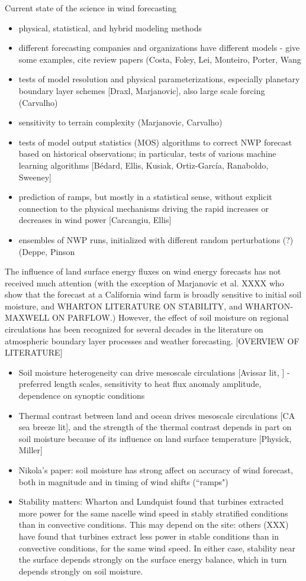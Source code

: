 \documentclass[12pt]{amsart}
\begin{document}
Current state of the science in wind forecasting
\begin{itemize}
\item physical, statistical, and hybrid modeling methods
\item different forecasting companies and organizations have different models - give some examples, cite review papers (Costa, Foley, Lei, Monteiro, Porter, Wang
\item tests of model resolution and physical parameterizations, especially planetary boundary layer schemes [Draxl, Marjanovic], also large scale forcing (Carvalho)
\item sensitivity to terrain complexity (Marjanovic, Carvalho)
\item tests of model output statistics (MOS) algorithms to correct NWP forecast based on historical observations; in particular, tests of various machine learning algorithms [B\'edard, Ellis, Kusiak, Ortiz-Garc\'ia, Ranaboldo, Sweeney]
\item prediction of ramps, but mostly in a statistical sense, without explicit connection to the physical mechanisms driving the rapid increases or decreases in wind power [Carcangiu, Ellis]
\item ensembles of NWP runs, initialized with different random perturbations (?) (Deppe, Pinson
\end{itemize}

The influence of land surface energy fluxes on wind energy forecasts has not received much attention (with the exception of Marjanovic et al. XXXX who show that the forecast at a California wind farm is broadly sensitive to initial soil moisture, and WHARTON LITERATURE ON STABILITY, and WHARTON-MAXWELL ON PARFLOW.)  However, the effect of soil moisture on regional circulations has been recognized for several decades in the literature on atmospheric boundary layer processes and weather forecasting.  [OVERVIEW OF LITERATURE]
\begin{itemize}
\item Soil moisture heterogeneity can drive mesoscale circulations [Avissar lit, ] - preferred length scales, sensitivity to heat flux anomaly amplitude, dependence on synoptic conditions
\item Thermal contrast between land and ocean drives mesoscale circulations [CA sea breeze lit], and the strength of the thermal contrast depends in part on soil moisture because of its influence on land surface temperature [Physick, Miller]
\item Nikola's paper: soil moisture has strong affect on accuracy of wind forecast, both in magnitude and in timing of wind shifts (``ramps")
\item Stability matters: Wharton and Lundquist found that turbines extracted more power for the same nacelle wind speed in stably stratified conditions than in convective conditions.  This may depend on the site: others (XXX) have found that turbines extract less power in stable conditions than in convective conditions, for the same wind speed.  In either case, stability near the surface depends strongly on the surface energy balance, which in turn depends strongly on soil moisture.
\end{itemize}
\end{document}
